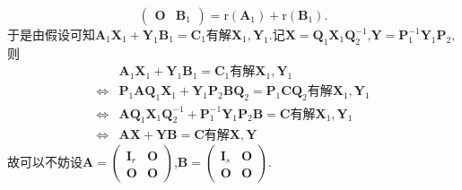 \documentclass[lang=cn,newtx,10pt,scheme=chinese]{elegantbook}
\begin{document}
\begin{note}
\[\begin{pmatrix}
        \boldsymbol{O} & \boldsymbol{B}_1
        \end{pmatrix}=\mathrm{r}(\boldsymbol{A}_1)+\mathrm{r}(\boldsymbol{B}_1).
        \]
        于是由假设可知\(\boldsymbol{A}_1\boldsymbol{X}_1+\boldsymbol{Y}_1\boldsymbol{B}_1=\boldsymbol{C}_1\)有解\(\boldsymbol{X}_1,\boldsymbol{Y}_1\).记\(\boldsymbol{X}=\boldsymbol{Q}_1\boldsymbol{X}_1\boldsymbol{Q}_{2}^{-1}\),\(\boldsymbol{Y}=\boldsymbol{P}_{1}^{-1}\boldsymbol{Y}_1\boldsymbol{P}_2\),则
        \begin{align*}
        &\boldsymbol{A}_1\boldsymbol{X}_1+\boldsymbol{Y}_1\boldsymbol{B}_1=\boldsymbol{C}_1\text{有解}\boldsymbol{X}_1,\boldsymbol{Y}_1\\
        \Leftrightarrow&\boldsymbol{P}_1\boldsymbol{AQ}_1\boldsymbol{X}_1+\boldsymbol{Y}_1\boldsymbol{P}_2\boldsymbol{BQ}_2=\boldsymbol{P}_1\boldsymbol{CQ}_2\text{有解}\boldsymbol{X}_1,\boldsymbol{Y}_1\\
        \Leftrightarrow&\boldsymbol{AQ}_1\boldsymbol{X}_1\boldsymbol{Q}_{2}^{-1}+\boldsymbol{P}_{1}^{-1}\boldsymbol{Y}_1\boldsymbol{P}_2\boldsymbol{B}=\boldsymbol{C}\text{有解}\boldsymbol{X}_1,\boldsymbol{Y}_1\\
        \Leftrightarrow&\boldsymbol{AX}+\boldsymbol{YB}=\boldsymbol{C}\text{有解}\boldsymbol{X},\boldsymbol{Y}
        \end{align*}
        故可以不妨设\(\boldsymbol{A}=\begin{pmatrix}
        \boldsymbol{I}_r & \boldsymbol{O} \\
        \boldsymbol{O} & \boldsymbol{O}
        \end{pmatrix}\),\(\boldsymbol{B}=\begin{pmatrix}
        \boldsymbol{I}_s & \boldsymbol{O} \\
        \boldsymbol{O} & \boldsymbol{O}
        \end{pmatrix}\).
\end{note}
\end{document}
